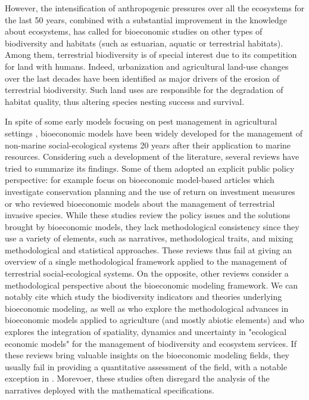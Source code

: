 However, the intensification of anthropogenic pressures over all the  ecosystems for the last 50 years, combined with a substantial improvement in the knowledge about ecosystems, has called for bioeconomic studies on other types of biodiversity and habitats (such as estuarian, aquatic or terrestrial habitats). Among them, terrestrial biodiversity is of special interest due to its competition for land with humans. Indeed, urbanization \citep{MCDONALD20081695, McKinney} and agricultural land-use changes \citep{review_agri_biodiv, REIDSMA200686} over the last decades have been identified as major drivers of the erosion of terrestrial biodiversity.
Such land uses are responsible for the degradation of habitat quality, thus altering species nesting success and survival. 
 
In spite of some early models focusing on pest management in agricultural settings \citep{Hueth1974,Feder1975}, bioeconomic models have been widely developed for the management of non-marine social-ecological systems 20 years after their application to marine resources. Considering such a development of the literature, several reviews have tried to summarize its findings. Some of them adopted an explicit public policy perspective: for example \cite{Boyd2015} focus on bioeconomic model-based articles which investigate conservation planning and the use of return on investment measures or \cite{EpanchinNiell2017} who reviewed bioeconomic models about the management of terrestrial invasive species. While these studies review the policy issues and the solutions brought by bioeconomic models, they lack methodological consistency since  they use a variety of elements, such as narratives, methodological traits, and mixing methodological and statistical approaches. These reviews thus fail at giving an overview of a single methodological framework applied to the management of terrestrial social-ecological systems.
On the opposite, other reviews consider a methodological perspective about the bioeconomic modeling framework. We can notably cite \cite{Eppink2007} which study the biodiversity indicators and theories underlying bioeconomic modeling, as well as \cite{Castro2018} who explore the methodological advances in bioeconomic models applied to agriculture (and mostly abiotic elements) and \cite{Drechsler20200} who explores the integration of spatiality, dynamics and uncertainty in "ecological economic models" for the management of biodiversity and ecosystem services. 
If these reviews bring valuable insights on the bioeconomic modeling fields, they usually fail in providing a quantitative assessment of the field, with a notable exception in \cite{Drechsler20200}. Morevoer, these studies often disregard the analysis of the narratives deployed with the mathematical specifications.



